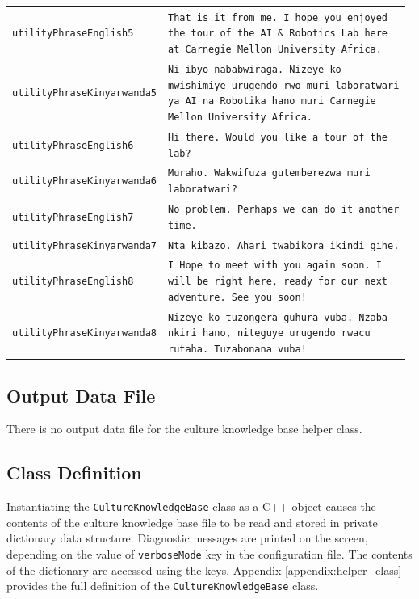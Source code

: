 \documentclass{CSSRforAfrica}
\begin{document}
\begin{table}[H]
\begin{tabular}{p{0.3\linewidth} p{0.68\linewidth}}
\footnotesize\texttt{utilityPhraseEnglish5} &
\footnotesize\texttt{That is it from me. I hope you enjoyed the tour of the AI \& Robotics Lab here at Carnegie Mellon University Africa.} \\

\footnotesize\texttt{utilityPhraseKinyarwanda5} &
\footnotesize\texttt{Ni ibyo nababwiraga. Nizeye ko mwishimiye urugendo rwo muri laboratwari ya AI na Robotika hano muri Carnegie Mellon University Africa.} \\

\footnotesize\texttt{utilityPhraseEnglish6} &
\footnotesize\texttt{Hi there. Would you like a tour of the lab?} \\

\footnotesize\texttt{utilityPhraseKinyarwanda6} &
\footnotesize\texttt{Muraho. Wakwifuza gutemberezwa muri laboratwari?} \\

\footnotesize\texttt{utilityPhraseEnglish7} &
\footnotesize\texttt{No problem. Perhaps we can do it another time.} \\

\footnotesize\texttt{utilityPhraseKinyarwanda7} &
\footnotesize\texttt{Nta kibazo. Ahari twabikora ikindi gihe.} \\

\footnotesize\texttt{utilityPhraseEnglish8} &
\footnotesize\texttt{I Hope to meet with you again soon. I will be right here, ready for our next adventure. See you soon!} \\

\footnotesize\texttt{utilityPhraseKinyarwanda8} &
\footnotesize\texttt{Nizeye ko tuzongera guhura vuba. Nzaba nkiri hano, niteguye urugendo rwacu rutaha. Tuzabonana vuba!} \\




\end{tabular}
\end{table}

\subsection{Output Data File}
There is no output data file for the culture knowledge base helper class. 


\subsection{Class Definition}
Instantiating the {\tt\small CultureKnowledgeBase} class as a C++ object causes the contents of the  culture knowledge base file to be read and stored in private  dictionary data structure. Diagnostic messages are printed on the screen, depending on the value of \texttt{verboseMode} key in the configuration file. The contents of the dictionary are accessed using the keys. 
Appendix \ref{appendix:helper_class} provides the full definition of the {\tt\small CultureKnowledgeBase} class.
\end{document}
